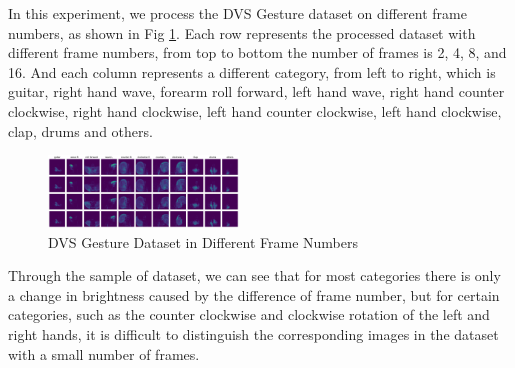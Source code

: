 \documentclass[conference]{IEEEtran}
\begin{document}
In this experiment, we process the DVS Gesture dataset on different frame numbers, as shown in Fig \ref{fig:dvs_gesture_frame_num}. Each row represents the processed dataset with different frame numbers, from top to bottom the number of frames is 2, 4, 8, and 16. And each column represents a different category, from left to right, which is guitar, right hand wave, forearm roll forward, left hand wave, right hand counter clockwise, right hand clockwise, left hand counter clockwise, left hand clockwise, clap, drums and others.
\begin{figure}
    \centering
    \includegraphics[width=0.45\textwidth]{figure/dataset.png}
    \caption{DVS Gesture Dataset in Different Frame Numbers}
    \label{fig:dvs_gesture_frame_num}
\end{figure}

Through the sample of dataset, we can see that for most categories there is only a change in brightness caused by the difference of frame number, but for certain categories, such as the counter clockwise and clockwise rotation of the left and right hands, it is difficult to distinguish the corresponding images in the dataset with a small number of frames.
\end{document}
